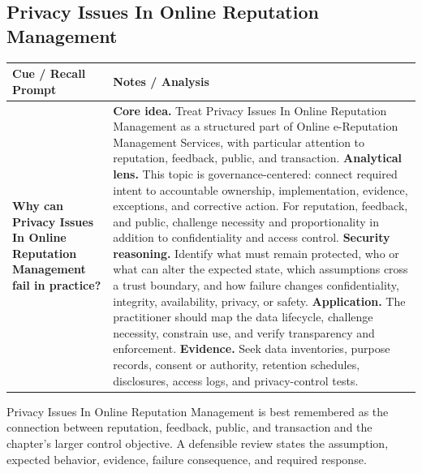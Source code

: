 \documentclass[11pt]{article}
\newcommand{\CornellHeader}{%
\rowcolor{Navy}\color{white}\bfseries Cue / Recall Prompt & \color{white}\bfseries Notes / Analysis\\\hline}
\newcommand{\CornellRow}[2]{%
\cellcolor{CueGray}\RaggedRight\textbf{#1} & \RaggedRight #2\\\hline}
\begin{document}
\subsection*{Privacy Issues In Online Reputation Management}
\begin{longtable}{>{\RaggedRight\arraybackslash}p{}|>{\RaggedRight\arraybackslash}p{}}
\CornellHeader
\CornellRow{Why can Privacy Issues In Online Reputation Management fail in practice?}{\textbf{Core idea.} Treat Privacy Issues In Online Reputation Management as a structured part of Online e-Reputation Management Services, with particular attention to reputation, feedback, public, and transaction. \textbf{Analytical lens.} This topic is governance-centered: connect required intent to accountable ownership, implementation, evidence, exceptions, and corrective action. For reputation, feedback, and public, challenge necessity and proportionality in addition to confidentiality and access control. \textbf{Security reasoning.} Identify what must remain protected, who or what can alter the expected state, which assumptions cross a trust boundary, and how failure changes confidentiality, integrity, availability, privacy, or safety. \textbf{Application.} The practitioner should map the data lifecycle, challenge necessity, constrain use, and verify transparency and enforcement. \textbf{Evidence.} Seek data inventories, purpose records, consent or authority, retention schedules, disclosures, access logs, and privacy-control tests.}
\end{longtable}
\begin{topicsummary}
Privacy Issues In Online Reputation Management is best remembered as the connection between reputation, feedback, public, and transaction and the chapter's larger control objective. A defensible review states the assumption, expected behavior, evidence, failure consequence, and required response.
\end{topicsummary}
\end{document}
